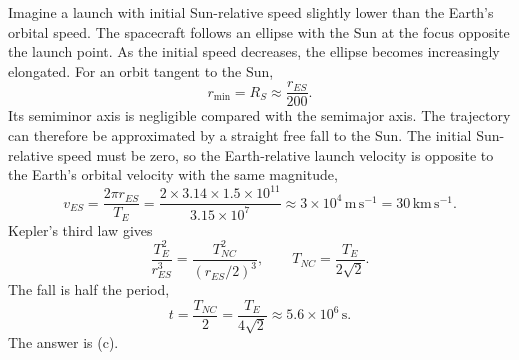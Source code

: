 Imagine a launch with initial Sun-relative speed slightly lower than the
Earth's orbital speed. The spacecraft follows an ellipse with the Sun at
the focus opposite the launch point. As the initial speed decreases, the
ellipse becomes increasingly elongated. For an orbit tangent to the Sun,
\[
r_{\min}=R_S\approx\frac{r_{ES}}{200}.
\]
Its semiminor axis is negligible compared with the semimajor axis. The
trajectory can therefore be approximated by a straight free fall to the Sun.
The initial Sun-relative speed must be zero, so the Earth-relative launch
velocity is opposite to the Earth's orbital velocity with the same magnitude,
\[
v_{ES}=\frac{2\pi r_{ES}}{T_E}
=\frac{2\times3.14\times1.5\times10^{11}}{3.15\times10^7}
\approx3\times10^4\,\mathrm{m\,s^{-1}}=30\,\mathrm{km\,s^{-1}}.
\]
Kepler's third law gives
\[
\frac{T_E^2}{r_{ES}^3}=\frac{T_{NC}^2}{(r_{ES}/2)^3},\qquad
T_{NC}=\frac{T_E}{2\sqrt2}.
\]
The fall is half the period,
\[t=\frac{T_{NC}}2=\frac{T_E}{4\sqrt2}\approx5.6\times10^6\,\mathrm{s}.\]
The answer is (c).
